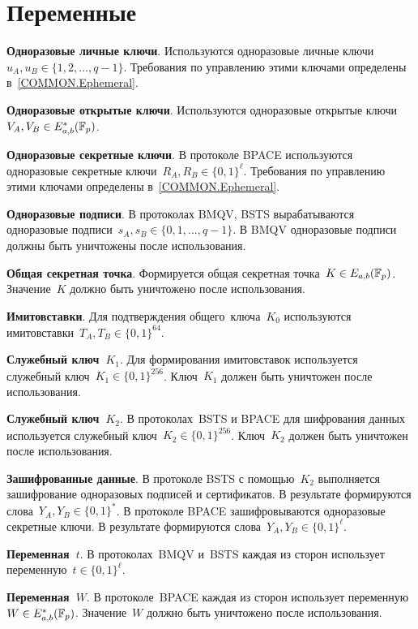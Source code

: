 \section{Переменные}\label{VARS}

{\bf Одноразовые личные ключи}.
Используются одноразовые личные ключи~$u_A,u_B\in\{1,2,\ldots,q-1\}$. Требования
по управлению этими ключами определены в~\ref{COMMON.Ephemeral}.

{\bf Одноразовые открытые ключи}.
Используются одноразовые открытые ключи~$V_A,V_B\in E_{a,b}^*(\mathbb{F}_p)$.
                                                  
{\bf Одноразовые секретные ключи}.
В протоколе BPACE используются одноразовые секретные
ключи~$R_A,R_B\in\{0,1\}^\ell$. Требования по управлению этими ключами
определены в~\ref{COMMON.Ephemeral}.

{\bf Одноразовые подписи}. 
В протоколах BMQV, BSTS вырабатываются одноразовые
подписи~$s_A,s_B\in\{0,1,\ldots,q-1\}$. В BMQV одноразовые подписи должны быть
уничтожены после использования.

{\bf Общая секретная точка}. 
Формируется общая секретная точка~$K\in E_{a,b}(\mathbb{F}_p)$. Значение~$K$ должно
быть уничтожено после использования.

{\bf Имитовставки}. 
Для подтверждения общего~ключа~$K_0$ используются
имитовставки~$T_A,T_B\in\{0,1\}^{64}$.

{\bf Служебный ключ~$K_1$}. 
Для формирования имитовставок используется служебный ключ~$K_1\in\{0,1\}^{256}$.
Ключ~$K_1$ должен быть уничтожен после использования.

{\bf Служебный ключ~$K_2$}.                             
В протоколах~BSTS и BPACE для шифрования данных используется служебный
ключ~$K_2\in\{0,1\}^{256}$. Ключ~$K_2$ должен быть уничтожен после
использования.

{\bf Зашифрованные данные}. 
В протоколе BSTS с помощью~$K_2$ выполняется зашифрование одноразовых подписей и
сертификатов. В результате формируются слова~$Y_A,Y_B\in\{0,1\}^*$.
%
В протоколе BPACE зашифровываются одноразовые секретные ключи. В результате
формируются слова~$Y_A,Y_B\in\{0,1\}^\ell$.

{\bf Переменная~$t$}. 
В протоколах~BMQV и~BSTS каждая из сторон использует
переменную~$t\in\{0,1\}^\ell$.

{\bf Переменная~$W$}. 
В протоколе~BPACE каждая из сторон использует 
переменную~$W\in E_{a,b}^*(\mathbb{F}_p)$.
%
Значение~$W$ должно быть уничтожено после использования.
